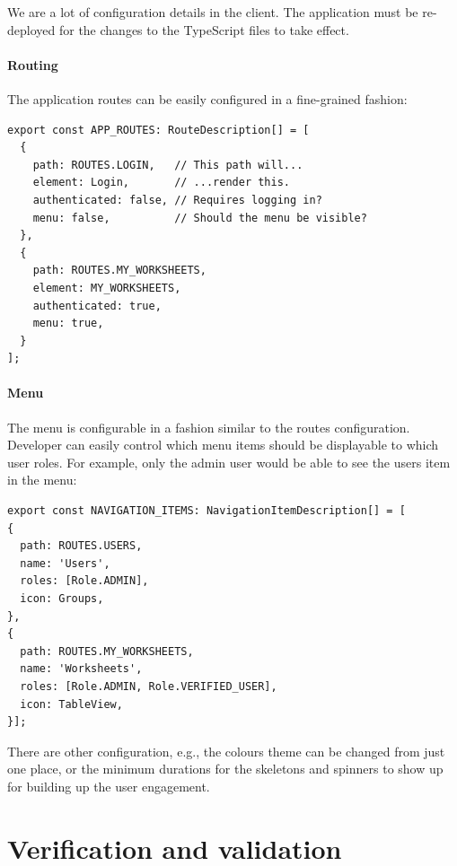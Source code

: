 \documentclass[a4paper,twoside,12pt]{book}
\begin{document}
We are a lot of configuration details in the client. The application must be re-deployed for the changes to the TypeScript files to take effect.

\subsubsection{Routing}

The application routes can be easily configured in a fine-grained fashion:

\begin{verbatim}
export const APP_ROUTES: RouteDescription[] = [
  {
    path: ROUTES.LOGIN,   // This path will...
    element: Login,       // ...render this.
    authenticated: false, // Requires logging in?
    menu: false,          // Should the menu be visible?
  },
  {
    path: ROUTES.MY_WORKSHEETS,
    element: MY_WORKSHEETS,
    authenticated: true,
    menu: true,
  }
];
\end{verbatim}

\subsubsection{Menu}

The menu is configurable in a fashion similar to the routes configuration. Developer can easily control which menu items should be displayable to which user roles. For example, only the admin user would be able to see the users item in the menu:

\begin{verbatim}
export const NAVIGATION_ITEMS: NavigationItemDescription[] = [
{
  path: ROUTES.USERS,
  name: 'Users',
  roles: [Role.ADMIN],
  icon: Groups,
},
{
  path: ROUTES.MY_WORKSHEETS,
  name: 'Worksheets',
  roles: [Role.ADMIN, Role.VERIFIED_USER],
  icon: TableView,
}];
\end{verbatim}

There are other configuration, e.g., the colours theme can be changed from just one place, or the minimum durations for the skeletons and spinners to show up for building up the user engagement.

\chapter{Verification and validation}
\end{document}
